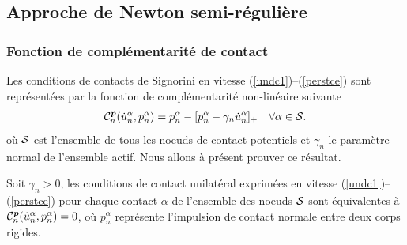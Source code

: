 \subsection{Approche de Newton semi-régulière}\label{semi-smooth_newton}

\subsubsection{Fonction de complémentarité de contact}\label{func_comp_cont}

\noindent Les conditions de contacts de Signorini en vitesse (\ref{undc1})--(\ref{perstce}) sont représentées par la fonction de complémentarité non-linéaire suivante 
\begin{align}\label{fcomp1}
{\cal C}_{n}^{\boldsymbol{p}}(\dot{u}^{\alpha}_n,p^{\alpha}_n)=p^{\alpha}_n - [p^{\alpha}_n - \gamma_n \dot{u}^{\alpha}_n]_+ \quad \forall \alpha \in {\cal S}.
\end{align}
\noindent où ${\cal S}$ est l'ensemble de tous les noeuds de contact potentiels et $ \gamma_n $ le paramètre normal de l'ensemble actif. Nous allons à présent prouver ce résultat.

\begin{proposition}\label{propos1}
Soit $\gamma_n>0$, les conditions de contact unilatéral exprimées en vitesse (\ref{undc1})--(\ref{perstce}) pour chaque contact $\alpha$  de l'ensemble des noeuds  ${\cal S}$ sont équivalentes à ${\cal C}_{n}^{\boldsymbol{p}}(\dot{u}^{\alpha}_n,p^{\alpha}_n)=0$,
où $p^{\alpha}_n$ représente l'impulsion de contact normale entre deux corps rigides.
\end{proposition}

